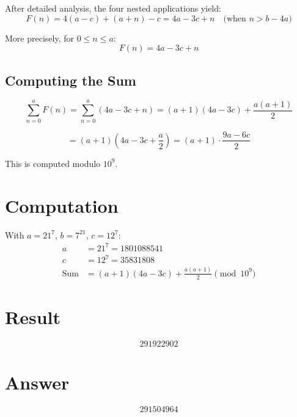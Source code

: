 \documentclass[12pt]{article}
\begin{document}
After detailed analysis, the four nested applications yield:
\[
F(n) = 4(a - c) + (a + n) - c = 4a - 3c + n \quad \text{(when } n > b - 4a\text{)}
\]

More precisely, for $0 \le n \le a$:
\[
F(n) = 4a - 3c + n
\]

\subsection{Computing the Sum}

\[
\sum_{n=0}^{a} F(n) = \sum_{n=0}^{a} (4a - 3c + n) = (a+1)(4a - 3c) + \frac{a(a+1)}{2}
\]

\[
= (a+1)\left(4a - 3c + \frac{a}{2}\right) = (a+1) \cdot \frac{9a - 6c}{2}
\]

This is computed modulo $10^9$.

\section{Computation}

With $a = 21^7$, $b = 7^{21}$, $c = 12^7$:
\begin{align}
a &= 21^7 = 1801088541 \\
c &= 12^7 = 35831808 \\
\text{Sum} &= (a+1)(4a - 3c) + \frac{a(a+1)}{2} \pmod{10^9}
\end{align}

\section{Result}

\[
\boxed{291922902}
\]

\section{Answer}

\[
\boxed{291504964}
\]
\end{document}
